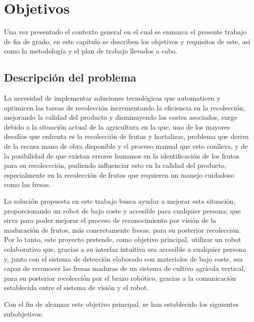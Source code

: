 \chapter{Objetivos}
\label{cap:capitulo3}
\setcounter{footnote}{12}
 
Una vez presentado el contexto general en el cual se enmarca el presente trabajo de fin de grado, en este capítulo se describen los objetivos y requisitos de este, así como la metodología y el plan de trabajo llevados a cabo.\\

\section{Descripción del problema}
\label{sec:descripcion}

La necesidad de implementar soluciones tecnológicas que automaticen y optimicen las tareas de recolección incrementando la eficiencia en la recolección, mejorando la calidad del producto y disminuyendo los costes asociados, surge debido a la situación actual de la agricultura en la que, uno de los mayores desafíos que enfrenta es la recolección de frutas y hortalizas, problema que deriva de la escasa mano de obra disponible y el proceso manual que esto conlleva, y de la posibilidad de que existan errores humanos en la identificación de los frutos para su recoleccción, pudiendo influenciar esto en la calidad del producto, especialmente en la recolección de frutos que requieren un manejo cuidadoso como las fresas.

La solución propuesta en este trabajo busca ayudar a mejorar esta situación,
proporcionando un robot de bajo coste y accesible para cualquier persona; que sirva para poder mejorar el proceso de reconocimiento por visión de la maduración de frutos, más concretamente fresas, para su posterior recolección. Por lo tanto, este proyecto pretende, como objetivo principal, utilizar un robot colaborativo que, gracias a su interfaz intuitiva sea accesible a cualquier persona y, junto con el sistema de detección elaborado con materiales de bajo coste, sea capaz de reconocer las fresas maduras de un sistema de cultivo agrícola vertical, para su posterior recolección por el brazo robótico, gracias a la comunicación establecida entre el sistema de visión y el robot. 

Con el fin de alcanzar este objetivo principal, se han establecido los siguientes
subobjetivos:

